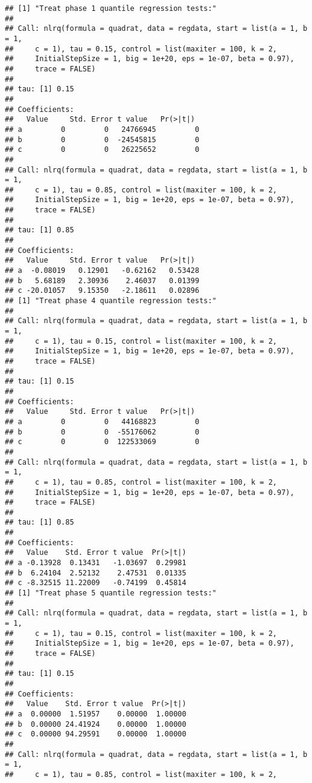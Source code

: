 \documentclass[
]{article}
\begin{document}
\begin{verbatim}
## [1] "Treat phase 1 quantile regression tests:"
## 
## Call: nlrq(formula = quadrat, data = regdata, start = list(a = 1, b = 1, 
##     c = 1), tau = 0.15, control = list(maxiter = 100, k = 2, 
##     InitialStepSize = 1, big = 1e+20, eps = 1e-07, beta = 0.97), 
##     trace = FALSE)
## 
## tau: [1] 0.15
## 
## Coefficients:
##   Value     Std. Error t value   Pr(>|t|) 
## a         0         0   24766945         0
## b         0         0  -24545815         0
## c         0         0   26225652         0
## 
## Call: nlrq(formula = quadrat, data = regdata, start = list(a = 1, b = 1, 
##     c = 1), tau = 0.85, control = list(maxiter = 100, k = 2, 
##     InitialStepSize = 1, big = 1e+20, eps = 1e-07, beta = 0.97), 
##     trace = FALSE)
## 
## tau: [1] 0.85
## 
## Coefficients:
##   Value     Std. Error t value   Pr(>|t|) 
## a  -0.08019   0.12901   -0.62162   0.53428
## b   5.68189   2.30936    2.46037   0.01399
## c -20.01057   9.15350   -2.18611   0.02896
## [1] "Treat phase 4 quantile regression tests:"
## 
## Call: nlrq(formula = quadrat, data = regdata, start = list(a = 1, b = 1, 
##     c = 1), tau = 0.15, control = list(maxiter = 100, k = 2, 
##     InitialStepSize = 1, big = 1e+20, eps = 1e-07, beta = 0.97), 
##     trace = FALSE)
## 
## tau: [1] 0.15
## 
## Coefficients:
##   Value     Std. Error t value   Pr(>|t|) 
## a         0         0   44168823         0
## b         0         0  -55176062         0
## c         0         0  122533069         0
## 
## Call: nlrq(formula = quadrat, data = regdata, start = list(a = 1, b = 1, 
##     c = 1), tau = 0.85, control = list(maxiter = 100, k = 2, 
##     InitialStepSize = 1, big = 1e+20, eps = 1e-07, beta = 0.97), 
##     trace = FALSE)
## 
## tau: [1] 0.85
## 
## Coefficients:
##   Value    Std. Error t value  Pr(>|t|)
## a -0.13928  0.13431   -1.03697  0.29981
## b  6.24104  2.52132    2.47531  0.01335
## c -8.32515 11.22009   -0.74199  0.45814
## [1] "Treat phase 5 quantile regression tests:"
## 
## Call: nlrq(formula = quadrat, data = regdata, start = list(a = 1, b = 1, 
##     c = 1), tau = 0.15, control = list(maxiter = 100, k = 2, 
##     InitialStepSize = 1, big = 1e+20, eps = 1e-07, beta = 0.97), 
##     trace = FALSE)
## 
## tau: [1] 0.15
## 
## Coefficients:
##   Value    Std. Error t value  Pr(>|t|)
## a  0.00000  1.51957    0.00000  1.00000
## b  0.00000 24.41924    0.00000  1.00000
## c  0.00000 94.29591    0.00000  1.00000
## 
## Call: nlrq(formula = quadrat, data = regdata, start = list(a = 1, b = 1, 
##     c = 1), tau = 0.85, control = list(maxiter = 100, k = 2, 

\end{verbatim}
\end{document}
